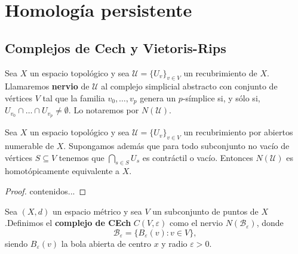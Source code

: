 
\chapter{Homología persistente}

\section{Complejos de Cech y Vietoris-Rips}
\begin{definicion}
	Sea \(X\) un espacio topológico y sea \(\mathcal{U} = \{U_v\}_{v \in V}\) un recubrimiento de \(X\). Llamaremos \textbf{nervio} de \(\mathcal{U}\) al complejo simplicial abstracto con conjunto de vértices \(V\) tal que la familia \(v_0, \dots, v_p\) genera un \(p\)-símplice si, y sólo si, \(U_{v_0} \cap \dots \cap U_{v_p} \neq \emptyset\). Lo notaremos por \(N(\mathcal{U})\).
\end{definicion}

\begin{teorema}
	Sea \(X\) un espacio topológico y sea \(\mathcal{U} = \{U_v\}_{v \in V}\) un recubrimiento por abiertos numerable de \(X\). Supongamos además que para todo subconjunto no vacío de vértices \(S \subseteq V\) tenemos que \(\bigcap_{s \in S} U_s\) es contráctil o vacío. Entonces \(N(\mathcal{U})\) es homotópicamente equivalente a \(X\).
\end{teorema}
\begin{proof}
	contenidos...
\end{proof}
\begin{definicion}
	Sea \((X,d)\) un espacio métrico y sea \(V\) un subconjunto de puntos de \(X\).Definimos el \textbf{complejo de CEch} \(C(V, \varepsilon)\) como el nervio \(N(\mathcal{B}_\varepsilon)\), donde
	\[
		\mathcal{B}_\varepsilon = \{ B_{\varepsilon}(v) : v \in V \},
	\]
	siendo \(B_{\varepsilon}(v)\) la bola abierta de centro \(x\) y radio \(\varepsilon > 0\).
\end{definicion}


